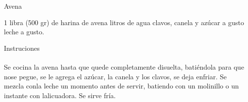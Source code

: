 \documentclass{article}
\begin{document}
  {\noindent \huge Avena}
  \vspace{1cm}

  \begin{multicols}{2}
  \noindent \color{light}
      1 libra (500 gr) de harina de avena litros de agua\newline
        clavos, canela y azúcar a gusto\newline
      leche a gusto.\newline
    \end{multicols}
  \vspace{1cm}

  {\noindent \LARGE Instruciones}\\
  \\
  \noindent \color{light} Se cocina la avena hasta que quede completamente disuelta, batiéndola
para que nose pegue, se le agrega el azúcar, la ca­nela y los clavos, se
deja enfriar. Se mezcla conla leche un momento antes de servir, batiendo
con un molinillo o un instante con lalicuadora. Se sirve fría.
\end{document}

